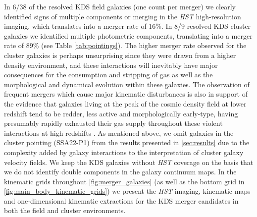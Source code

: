 \documentclass[fleqn,usenatbib]{mnras}
\begin{document}
\noindent
In 6/38 of the resolved KDS field galaxies (one count per merger) we clearly identified signs of multiple components or merging in the {\em HST} high-resolution imaging, which translates into a merger rate of 16\%.
In 8/9 resolved KDS cluster galaxies we identified multiple photometric components, translating into a merger rate of 89\%  (see Table \ref{tab:pointings}).
The higher merger rate observed for the cluster galaxies is perhaps unsurprising since they were drawn from a higher density environment, and these interactions will inevitably have major consequences for the consumption and stripping of gas as well as the morphological and dynamical evolution within these galaxies.
The observation of frequent mergers which cause major kinematic disturbances is also in support of the evidence that galaxies living at the peak of the cosmic density field at lower redshift tend to be redder, less active and morphologically early-type, having presumably rapidly exhausted their gas supply throughout these violent interactions at high redshifts \citep[e.g.][]{Steidel1998,White2007,Kodama2007,Zheng2009}.
As mentioned above, we omit galaxies in the cluster pointing (SSA22-P1) from the results presented in \cref{sec:results} due to the complexity added by galaxy interactions to the interpretation of cluster galaxy velocity fields.
We keep the KDS galaxies without {\em HST} coverage on the basis that we do not identify double components in the galaxy continuum maps. 
In the kinematic grids throughout \ref{fig:merger_galaxies} (as well as the bottom grid in \ref{fig:main_body_kinematic_grids}) we present the {\em HST} imaging, kinematic maps and one-dimensional kinematic extractions for the KDS merger candidates in both the field and cluster environments.
\end{document}

